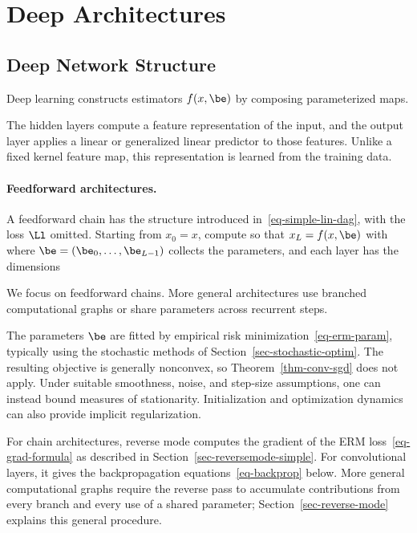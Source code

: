 \section{Deep Architectures}
\label{sec-deepnet-discr}

                                          
\subsection{Deep Network Structure}
\label{sec-deep-structure}

Deep learning constructs estimators $f(x,\be)$ by composing parameterized maps.
 
The hidden layers compute a feature representation of the input, and the output layer applies a linear or generalized linear predictor to those features. Unlike a fixed kernel feature map, this representation is learned from the training data.

   
\paragraph{Feedforward architectures.}

A feedforward chain has the structure introduced in~\eqref{eq-simple-lin-dag}, with the loss $\Ll$ omitted. Starting from $x_0=x$, compute
so that $x_L=f(x,\be)$ with 
where $\be=(\be_0,\ldots,\be_{L-1})$ collects the parameters, and each layer has the dimensions
 
We focus on feedforward chains. More general architectures use branched computational graphs or share parameters across recurrent steps.

The parameters $\be$ are fitted by empirical risk minimization~\eqref{eq-erm-param}, typically using the stochastic methods of Section~\ref{sec-stochastic-optim}. The resulting objective is generally nonconvex, so Theorem~\ref{thm-conv-sgd} does not apply. Under suitable smoothness, noise, and step-size assumptions, one can instead bound measures of stationarity. Initialization and optimization dynamics can also provide implicit regularization.

For chain architectures, reverse mode computes the gradient of the ERM loss~\eqref{eq-grad-formula} as described in Section~\ref{sec-reversemode-simple}. For convolutional layers, it gives the backpropagation equations~\eqref{eq-backprop} below. More general computational graphs require the reverse pass to accumulate contributions from every branch and every use of a shared parameter; Section~\ref{sec-reverse-mode} explains this general procedure.

